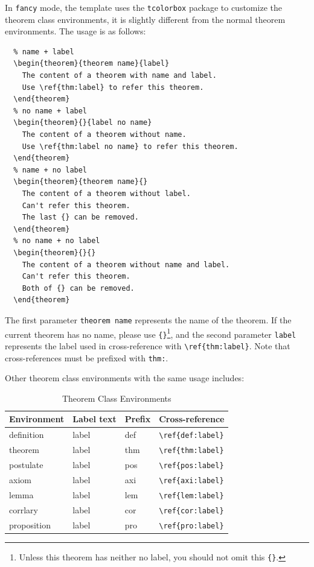 \documentclass[11pt,bibend=bibtex]{elegantbook}
\begin{document}
In \lstinline{fancy} mode, the template uses the \lstinline{tcolorbox} package to customize the theorem class environments, it is slightly different from the normal theorem environments. The usage is as follows:
\begin{lstlisting}
  % name + label
  \begin{theorem}{theorem name}{label}
    The content of a theorem with name and label. 
    Use \ref{thm:label} to refer this theorem.
  \end{theorem}
  % no name + label
  \begin{theorem}{}{label no name}
    The content of a theorem without name.
    Use \ref{thm:label no name} to refer this theorem.
  \end{theorem}
  % name + no label
  \begin{theorem}{theorem name}{}
    The content of a theorem without label.
    Can't refer this theorem.
    The last {} can be removed.
  \end{theorem}
  % no name + no label
  \begin{theorem}{}{}
    The content of a theorem without name and label.
    Can't refer this theorem.
    Both of {} can be removed.
  \end{theorem}
  \end{lstlisting}

The first parameter \lstinline{theorem name} represents the name of the theorem. If the current theorem has no name, please use \lstinline|{}|\cprotect\footnote{Unless this theorem has neither no label, you should not omit this \verb|{}|.}, and the second parameter \lstinline{label} represents the label used in cross-reference with \verb|\ref{thm:label}|. Note that cross-references must be prefixed with \lstinline{thm:}. 

Other theorem class environments with the same usage includes:

\begin{table}[htbp]
\centering
\caption{Theorem Class Environments}
  \begin{tabular}{llll}
  \toprule
  Environment & Label text & Prefix & Cross-reference \\
  \midrule
  definition & label & def   & \lstinline|\ref{def:label}| \\
  theorem & label & thm   & \lstinline|\ref{thm:label}| \\
  postulate & label & pos & \lstinline|\ref{pos:label}| \\
  axiom & label & axi & \lstinline|\ref{axi:label}|\\
  lemma & label & lem   & \lstinline|\ref{lem:label}| \\
  corrlary & label & cor   & \lstinline|\ref{cor:label}| \\
  proposition & label & pro   & \lstinline|\ref{pro:label}| \\
  \bottomrule
  \end{tabular}%
\label{tab:theorem-class}%
\end{table}%
\end{document}
